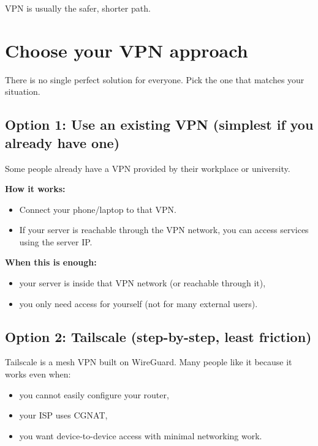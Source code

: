 VPN is usually the safer, shorter path.

\section{Choose your VPN approach}
There is no single perfect solution for everyone. Pick the one that matches your situation.

\subsection{Option 1: Use an existing VPN (simplest if you already have one)}
Some people already have a VPN provided by their workplace or university.

\textbf{How it works:}
\begin{itemize}[leftmargin=*]
  \item Connect your phone/laptop to that VPN.
  \item If your server is reachable through the VPN network, you can access services using the server IP.
\end{itemize}

\textbf{When this is enough:}
\begin{itemize}[leftmargin=*]
  \item your server is inside that VPN network (or reachable through it),
  \item you only need access for yourself (not for many external users).
\end{itemize}



\subsection{Option 2: Tailscale (step-by-step, least friction)}
Tailscale is a mesh VPN built on WireGuard. Many people like it because it works even when:
\begin{itemize}[leftmargin=*]
  \item you cannot easily configure your router,
  \item your ISP uses CGNAT,
  \item you want device-to-device access with minimal networking work.
\end{itemize}


